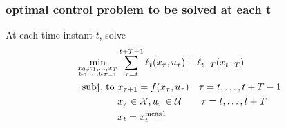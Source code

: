 \documentclass[openany]{book}
\theoremstyle{definition}
\theoremstyle{remark}
\begin{document}
\subsubsection{optimal control problem to be solved at each t}
At each time instant $t$, solve 
\begin{align*}
    \min_{\substack{x_0,x_1,\dots,x_T\\u_0,\dots,u_{T-1}}} & \displaystyle\sum_{\tau=t}^{t+T-1}\ell_t(x_\tau,u_\tau)+\ell_{t+T}(x_{t+T})\\
        \text{subj.\ to } & x_{\tau+1}=f(x_\tau,u_\tau) \quad \tau=t,\dots,t+T-1\\
                         & x_\tau \in \mathcal{X}, u_\tau \in \mathcal{U} \qquad \tau=t,\dots,t+T\\
                         & x_t = x_t^{\text{meas}}\text{\footnotemark}
\end{align*}
\end{document}
